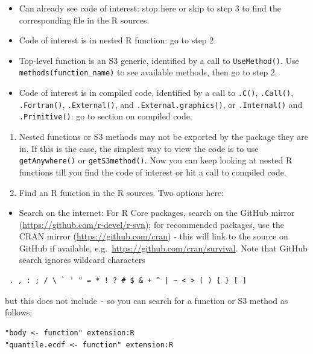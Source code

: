 \documentclass[
]{book}
\providecommand{\tightlist}{%
  \setlength{\itemsep}{0pt}\setlength{\parskip}{0pt}}
\begin{document}
\begin{itemize}
\item
  Can already see code of interest: stop here or skip to step 3 to find the corresponding file in the R sources.
\item
  Code of interest is in nested R function: go to step 2.
\item
  Top-level function is an S3 generic, identified by a call to \texttt{UseMethod()}. Use \texttt{methods(function\_name)} to see available methods, then go to step 2.
\item
  Code of interest is in compiled code, identified by a call to \texttt{.C()}, \texttt{.Call()}, \texttt{.Fortran()}, \texttt{.External()}, and \texttt{.External.graphics()}, or \texttt{.Internal()} and \texttt{.Primitive()}: go to section on compiled code.
\end{itemize}

\begin{enumerate}
\def\labelenumi{\arabic{enumi}.}
\setcounter{enumi}{1}
\item
  Nested functions or S3 methods may not be exported by the package they are in. If this is the case, the simplest way to view the code is to use \texttt{getAnywhere()} or \texttt{getS3method()}. Now you can keep looking at nested R functions till you find the code of interest or hit a call to compiled code.
\item
  Find an R function in the R sources. Two options here:
\end{enumerate}

\begin{itemize}
\tightlist
\item
  Search on the internet: For R Core packages, search on the GitHub mirror (\url{https://github.com/r-devel/r-svn}); for recommended packages, use the CRAN mirror (\url{https://github.com/cran}) - this will link to the source on GitHub if available, e.g.~\url{https://github.com/cran/survival}. Note that GitHub search ignores wildcard characters
\end{itemize}

\begin{verbatim}
 . , : ; / \ ` ' " = * ! ? # $ & + ^ | ~ < > ( ) { } [ ]
\end{verbatim}

but this does not include \texttt{-} so you can search for a function or S3 method as follows:

\begin{verbatim}
"body <- function" extension:R
"quantile.ecdf <- function" extension:R
\end{verbatim}
\end{document}
